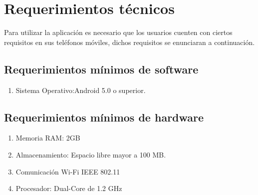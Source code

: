 \section{Requerimientos técnicos}
Para utilizar la aplicación es necesario que los usuarios cuenten con ciertos requisitos en sus teléfonos móviles, dichos requisitos se enunciaran a continuación.
\subsection{Requerimientos mínimos de software}
\begin{enumerate}
	\item Sistema Operativo:Android 5.0 o superior.
\end{enumerate}
\subsection{Requerimientos mínimos de hardware}
\begin{enumerate}
	\item Memoria RAM: 2GB
	\item Almacenamiento: Espacio libre mayor a 100 MB.
	\item Comunicación Wi-Fi IEEE 802.11 
	\item Procesador: Dual-Core de 1.2 GHz
\end{enumerate}